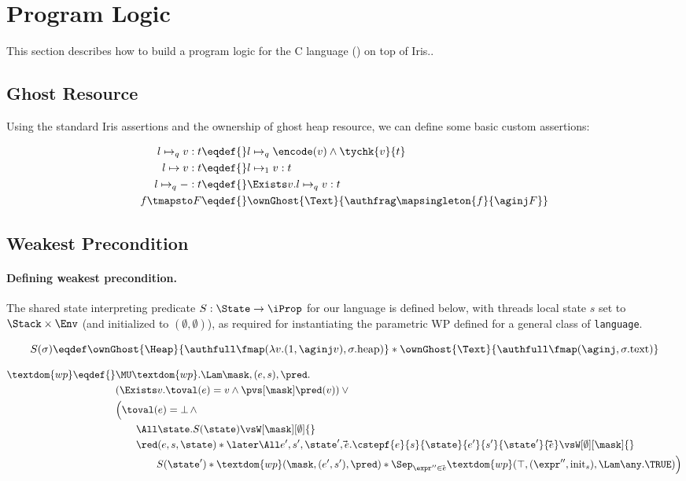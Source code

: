 \section{Program Logic}
\label{sec:program-logic}

This section describes how to build a program logic for the C language (\cf {}) on top of Iris..

\subsection{Ghost Resource}

Using the standard Iris assertions and the ownership of ghost heap resource, we can define some basic custom assertions:

\begin{align*}
l \mapsto_q v : t \eqdef{}&  l \mapsto_q \encode(v) \land \tychk{v}{t} \\
l \mapsto v : t              \eqdef{}& l \mapsto_1 v : t\\
l \mapsto_q - : t            \eqdef{}& \Exists v. l \mapsto_q v : t\\
f \tmapsto F \eqdef{}& \ownGhost{\Text}{\authfrag \mapsingleton{f}{\aginj F}}
\end{align*}

\subsection{Weakest Precondition}

\paragraph{Defining weakest precondition.}

The shared state interpreting predicate $S : \State \to \iProp$ for our \irisc{} language is defined below,
with threads local state $s$ set to $\Stack \times \Env$ (and initialized to $(\emptyset, \emptyset)$),
as required for instantiating the parametric WP defined for a general class of \texttt{language}.

\[S(\sigma) \eqdef 
  \ownGhost{\Heap}{\authfull \fmap (\lambda v. (1, \aginj v), \sigma.\text{heap})} *
  \ownGhost{\Text}{\authfull \fmap (\aginj, \sigma.\text{text})}
\]

\begin{align*}
  \textdom{wp} \eqdef{}& \MU \textdom{wp}. \Lam \mask, (e, s), \pred. \\
        & (\Exists v. \toval(e) = v \land \pvs[\mask] \pred(v)) \lor {}\\
        & \Bigl(\toval(e) = \bot \,\land \\
        &\qquad \All \state. S(\state) \vsW[\mask][\emptyset] {}\\
        &\qquad \red(e, s, \state) * \later\All e', s', \state', \vec e.
            \cstepf{e}{s}{\state}{e'}{s'}{\state'}{\vec e} \vsW[\emptyset][\mask] {}\\
            &\qquad\qquad S(\state') * \textdom{wp}(\mask, (e', s'), \pred) *
            \Sep_{\expr'' \in \vec e} \textdom{wp}(\top, (\expr'', \mathrm{init}_s), \Lam \any. \TRUE)\Bigr) \\
\end{align*}

